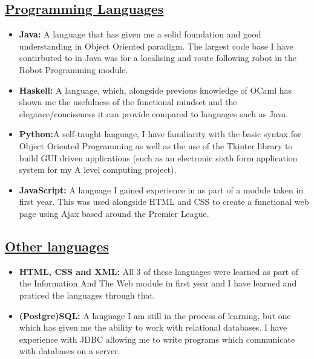 \documentclass[11pt]{article}
\begin{document}
		\subsection*{\underline{Programming Languages}}
		\begin{itemize}
			\item \textbf{Java:} A language that has given me a solid foundation and good understanding in Object Oriented paradigm. The largest code base I have contirbuted to in Java was for a localising and route following robot in the Robot Programming module.
			\item \textbf{Haskell:} A  language, which, alongside previous knowledge of OCaml has shown me the usefulness of the functional mindset and the elegance/conciseness it can provide compared to languages such as Java.
			\item \textbf{Python:}A self-taught language, I have familiarity with the basic syntax for Object Oriented Programming as well as the use of the Tkinter library to build GUI driven applications (such as an electronic sixth form application system for my A level computing project).
			\item \textbf{JavaScript:} A language I gained experience in as part of a module taken in first year. This was used alongside HTML and CSS to create a functional web page using Ajax based around the Premier League.
		\end{itemize} 
		\subsection*{\underline{Other languages}}
		\begin{itemize}
			\item \textbf{HTML, CSS and XML:} All 3 of these languages were learned as part of the Information And The Web module in first year and I have learned and praticed the languages through that.
			\item \textbf{(Postgre)SQL:} A language I am still in the process of learning, but one which has given me the ability to work with relational databases. I have experience with JDBC allowing me to write programs which communicate with databases on a server.
		\end{itemize}
\end{document}
